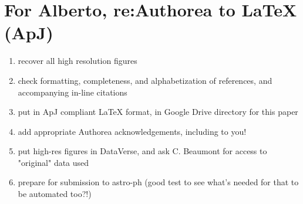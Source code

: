 \section{For Alberto, re:Authorea to LaTeX (ApJ)}

\begin{enumerate}
\item recover all high resolution figures
\item check formatting, completeness, and alphabetization of references, and accompanying in-line citations
\item put in ApJ compliant LaTeX format, in Google Drive directory for this paper
\item add appropriate Authorea acknowledgements, including to you!
\item put high-res figures in DataVerse, and ask C. Beaumont for access to "original" data used
\item prepare for submission to astro-ph (good test to see what's needed for that to be automated too?!)
\end{enumerate}